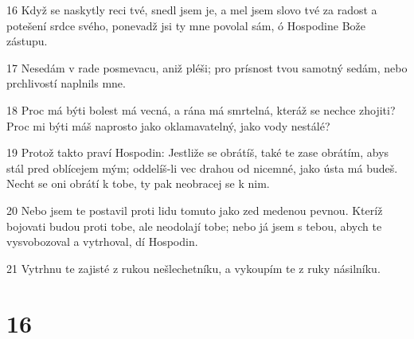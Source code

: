 \par 16 Když se naskytly reci tvé, snedl jsem je, a mel jsem slovo tvé za radost a potešení srdce svého, ponevadž jsi ty mne povolal sám, ó Hospodine Bože zástupu.
\par 17 Nesedám v rade posmevacu, aniž pléši; pro prísnost tvou samotný sedám, nebo prchlivostí naplnils mne.
\par 18 Proc má býti bolest má vecná, a rána má smrtelná, kteráž se nechce zhojiti? Proc mi býti máš naprosto jako oklamavatelný, jako vody nestálé?
\par 19 Protož takto praví Hospodin: Jestliže se obrátíš, také te zase obrátím, abys stál pred oblícejem mým; oddelíš-li vec drahou od nicemné, jako ústa má budeš. Necht se oni obrátí k tobe, ty pak neobracej se k nim.
\par 20 Nebo jsem te postavil proti lidu tomuto jako zed medenou pevnou. Kteríž bojovati budou proti tobe, ale neodolají tobe; nebo já jsem s tebou, abych te vysvobozoval a vytrhoval, dí Hospodin.
\par 21 Vytrhnu te zajisté z rukou nešlechetníku, a vykoupím te z ruky násilníku.

\chapter{16}

